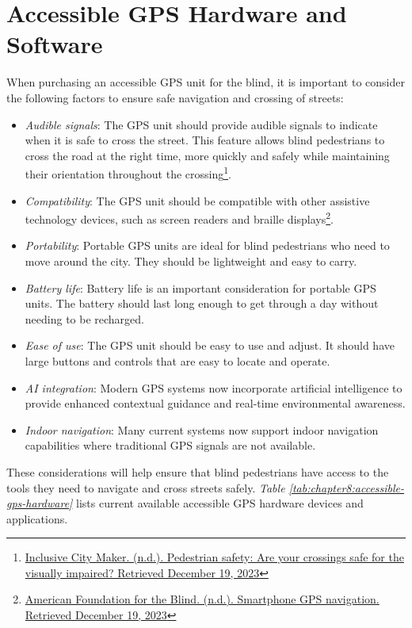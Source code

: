 \section{Accessible GPS Hardware and Software}\label{accessible-gps-mapping-hardware}
When purchasing an accessible GPS unit for the blind, it is important to consider the following factors to ensure safe navigation and crossing of streets:
\begin{itemize}
 \item \emph{Audible signals}: The GPS unit should provide audible signals to indicate when it is safe to cross the street. This feature allows blind pedestrians to cross the road at the right time, more quickly and safely while maintaining their orientation throughout the crossing\footnote{\href{http://www.inclusivecitymaker.com/pedestrian-safety-visually-impaired-blind-people/}{Inclusive City Maker. (n.d.). Pedestrian safety: Are your crossings safe for the visually impaired? Retrieved December 19, 2023}}.
 \item \emph{Compatibility}: The GPS unit should be compatible with other assistive technology devices, such as screen readers and braille displays\footnote{\href{http://www.afb.org/blindness-and-low-vision/using-technology/smartphone-gps-navigation-people-visual-impairments}{American Foundation for the Blind. (n.d.). Smartphone GPS navigation. Retrieved December 19, 2023}}.
 \item \emph{Portability}: Portable GPS units are ideal for blind pedestrians who need to move around the city. They should be lightweight and easy to carry.
 \item \emph{Battery life}: Battery life is an important consideration for portable GPS units. The battery should last long enough to get through a day without needing to be recharged.
 \item \emph{Ease of use}: The GPS unit should be easy to use and adjust. It should have large buttons and controls that are easy to locate and operate.
 \item \emph{AI integration}: Modern GPS systems now incorporate artificial intelligence to provide enhanced contextual guidance and real-time environmental awareness.
 \item \emph{Indoor navigation}: Many current systems now support indoor navigation capabilities where traditional GPS signals are not available.
\end{itemize}
These considerations will help ensure that blind pedestrians have access to the tools they need to navigate and cross streets safely. \emph{Table \ref{tab:chapter8:accessible-gps-hardware}} lists current available accessible GPS hardware devices and applications.

